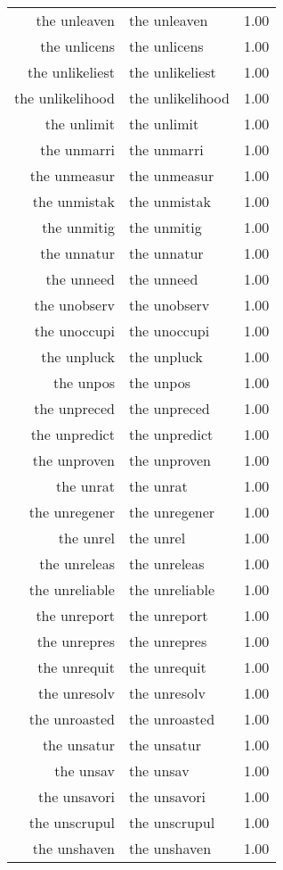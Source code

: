 \begin{table}[ht]
\begin{tabular}{rlr}
  the unleaven & the unleaven & 1.00 \\ 
  the unlicens & the unlicens & 1.00 \\ 
  the unlikeliest & the unlikeliest & 1.00 \\ 
  the unlikelihood & the unlikelihood & 1.00 \\ 
  the unlimit & the unlimit & 1.00 \\ 
  the unmarri & the unmarri & 1.00 \\ 
  the unmeasur & the unmeasur & 1.00 \\ 
  the unmistak & the unmistak & 1.00 \\ 
  the unmitig & the unmitig & 1.00 \\ 
  the unnatur & the unnatur & 1.00 \\ 
  the unneed & the unneed & 1.00 \\ 
  the unobserv & the unobserv & 1.00 \\ 
  the unoccupi & the unoccupi & 1.00 \\ 
  the unpluck & the unpluck & 1.00 \\ 
  the unpos & the unpos & 1.00 \\ 
  the unpreced & the unpreced & 1.00 \\ 
  the unpredict & the unpredict & 1.00 \\ 
  the unproven & the unproven & 1.00 \\ 
  the unrat & the unrat & 1.00 \\ 
  the unregener & the unregener & 1.00 \\ 
  the unrel & the unrel & 1.00 \\ 
  the unreleas & the unreleas & 1.00 \\ 
  the unreliable & the unreliable & 1.00 \\ 
  the unreport & the unreport & 1.00 \\ 
  the unrepres & the unrepres & 1.00 \\ 
  the unrequit & the unrequit & 1.00 \\ 
  the unresolv & the unresolv & 1.00 \\ 
  the unroasted & the unroasted & 1.00 \\ 
  the unsatur & the unsatur & 1.00 \\ 
  the unsav & the unsav & 1.00 \\ 
  the unsavori & the unsavori & 1.00 \\ 
  the unscrupul & the unscrupul & 1.00 \\ 
  the unshaven & the unshaven & 1.00 \\ 

\end{tabular}
\end{table}
